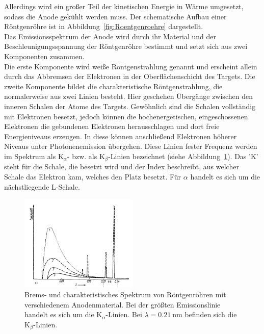 \documentclass[a4paper,twoside,final]{article}
\begin{document}
Allerdings wird ein großer Teil der kinetischen Energie in Wärme umgesetzt, sodass die Anode gekühlt werden muss. Der schematische Aufbau einer Röntgenröhre ist in Abbildung~\ref{fig:Roentgenroehre} dargestellt.\\
Das Emissionsspektrum der Anode wird durch ihr Material und der Beschleunigungsspannung der Röntgenröhre bestimmt und setzt sich aus zwei Komponenten zusammen.\\
Die erste Komponente wird \glqq{}weiße Röntgenstrahlung\grqq{} genannt und erscheint allein durch das Abbremsen der Elektronen in der Oberflächenschicht des Targets. Die zweite Komponente bildet die charakteristische Röntgenstrahlung, die normalerweise aus zwei Linien besteht. Hier geschehen Übergänge zwischen den inneren Schalen der Atome des Targets. Gewöhnlich sind die Schalen vollständig mit Elektronen besetzt, jedoch können die hochenergetischen, eingeschossenen Elektronen die gebundenen Elektronen herausschlagen und dort freie Energieniveaus erzeugen. In diese können anschließend Elektronen höherer Niveaus unter Photonenemission übergehen. Diese Linien fester Frequenz werden im Spektrum als K$_\alpha$- bzw. als K$_\beta$-Linien bezeichnet (siehe Abbildung~\ref{fig:Roentgenspektrum}). Das 'K' steht für die Schale, die besetzt wird und der Index beschreibt, aus welcher Schale das Elektron kam, welches den Platz besetzt. Für $\alpha$ handelt es sich um die nächstliegende L-Schale.\vspace{-5mm}
\begin{figure}[htp]
    \centering
    \includegraphics[width=0.5\textwidth]{Abbildungen/Roentgenspektrum.pdf}
    \caption{Brems- und charakteristisches Spektrum von Röntgenröhren mit verschiedenem Anodenmaterial. Bei der größten Emissionslinie handelt es sich um die K$_\alpha$-Linien. Bei $\lambda =\SI{0,21}{\nano\metre}$ befinden sich die K$_\beta$-Linien.~\cite[S.361]{Kleber}}
    \label{fig:Roentgenspektrum}
\end{figure}\\
\end{document}
